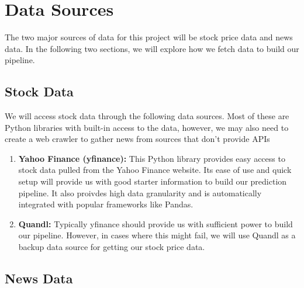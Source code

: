 \documentclass[10pt]{article}
\begin{document}
\section{Data Sources}

The two major sources of data for this project will be stock price data and news data. In the following two sections, we will explore how we fetch data to build our pipeline.

\subsection{Stock Data}

We will access stock data through the following data sources. Most of these are Python libraries with built-in access to the data, however, we may also need to create a web crawler to gather news from sources that don't provide APIs

\begin{enumerate}

\item \textbf{Yahoo Finance (yfinance):} This Python library provides easy access to stock data pulled from the Yahoo Finance website. Its ease of use and quick setup will provide us with good starter information to build our prediction pipeline. It also proivdes high data granularity and is automatically integrated with popular frameworks like Pandas.

\item \textbf{Quandl:} Typically yfinance should provide us with sufficient power to build our pipeline. However, in cases where this might fail, we will use Quandl as a backup data source for getting our stock price data.

\end{enumerate}

\subsection{News Data}
\end{document}
